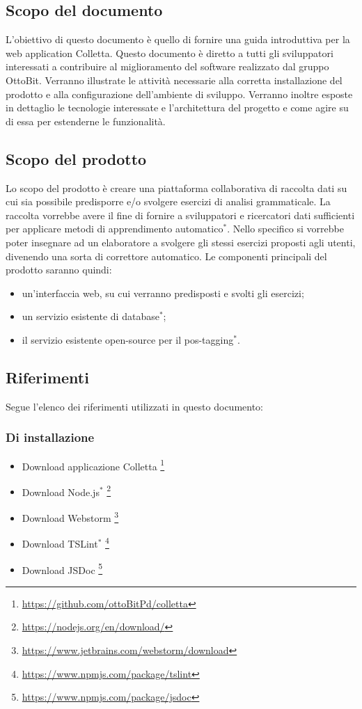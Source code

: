\subsection{Scopo del documento}
L'obiettivo di questo documento è quello di fornire una guida introduttiva per la web application Colletta. Questo documento è  diretto a tutti gli sviluppatori interessati a contribuire al miglioramento del software realizzato dal gruppo OttoBit. Verranno illustrate le attività necessarie alla corretta installazione del prodotto e alla configurazione dell'ambiente di sviluppo. Verranno inoltre esposte in dettaglio le tecnologie interessate e l'architettura del progetto e come agire su di essa per estenderne le funzionalità.
\subsection{Scopo del prodotto}
Lo scopo del prodotto è creare una piattaforma collaborativa di raccolta dati su cui sia possibile predisporre e/o svolgere esercizi di analisi grammaticale. La raccolta vorrebbe avere il fine di fornire a sviluppatori e ricercatori dati sufficienti per applicare metodi di apprendimento automatico$^*$. Nello specifico si vorrebbe poter insegnare ad un elaboratore a svolgere gli stessi esercizi proposti agli utenti, divenendo una sorta di correttore automatico.  
Le componenti principali del prodotto saranno quindi:
\begin{itemize}
	\item un'interfaccia web, su cui verranno predisposti e svolti gli esercizi;
	\item un servizio esistente di database$^*$;
	\item il servizio esistente open-source per il pos-tagging$^*$.
\end{itemize}
\subsection{Riferimenti}
Segue l'elenco dei riferimenti utilizzati in questo documento:
\subsubsection{Di installazione}
	\begin{itemize}
	\item Download applicazione Colletta
	\footnote{\url {https://github.com/ottoBitPd/colletta}}
	\item Download Node.js$^*$
	\footnote{\url {https://nodejs.org/en/download/}}
	\item Download Webstorm
	\footnote{\url {https://www.jetbrains.com/webstorm/download}}
	\item Download TSLint$^*$
	\footnote{\url {https://www.npmjs.com/package/tslint}}
	\item Download JSDoc
	\footnote{\url {https://www.npmjs.com/package/jsdoc}}
	
\end{itemize}
